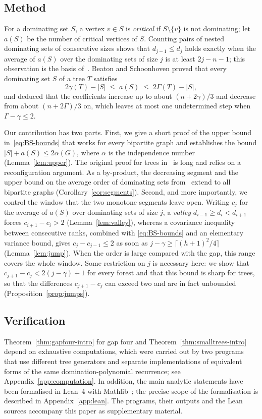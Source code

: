 \subsection*{Method}
For a dominating set $S$, a vertex $v\in S$ is \emph{critical} if
$S\setminus\{v\}$ is not dominating; let $a(S)$ be the number of critical
vertices of $S$. Counting pairs of nested dominating sets of consecutive
sizes shows that $d_{j-1}\le d_j$ holds exactly when the average of $a(S)$
over the dominating sets of size $j$ is at least $2j-n-1$; this observation
is the basis of~\cite{BS}. Beaton and Schoonhoven proved that every
dominating set $S$ of a tree $T$ satisfies
\begin{equation}\label{eq:BS-bounds}
  2\gamma(T)-|S|\;\le\; a(S)\;\le\; 2\Gamma(T)-|S| ,
\end{equation}
and deduced that the coefficients increase up to about $(n+2\gamma)/3$ and
decrease from about $(n+2\Gamma)/3$ on, which leaves at most one undetermined
step when $\Gamma-\gamma\le2$.

Our contribution has two parts. First, we give a short proof of the upper
bound in~\eqref{eq:BS-bounds} that works for every bipartite graph and
establishes the bound $|S|+a(S)\le 2\alpha(G)$, where $\alpha$ is the
independence number (Lemma~\ref{lem:upper}). The original proof for trees
in~\cite{BS} is long and relies on a reconfiguration argument. As a
by-product, the decreasing segment and the upper bound on the average order
of dominating sets from~\cite{BS} extend to all bipartite graphs
(Corollary~\ref{cor:segments}). Second, and more importantly, we control the
window that the two monotone segments leave open. Writing $c_j$ for the
average of $a(S)$ over dominating sets of size $j$, a \emph{valley}
$d_{i-1}\ge d_i<d_{i+1}$ forces $c_{i+1}-c_i>2$ (Lemma~\ref{lem:valley}),
whereas a covariance inequality between consecutive ranks, combined with
\eqref{eq:BS-bounds} and an elementary variance bound, gives
$c_{j}-c_{j-1}\le 2$ as soon as $j-\gamma\ge\lceil (h+1)^2/4\rceil$
(Lemma~\ref{lem:jump}). When the order is large compared with the gap, this
range covers the whole window. Some restriction on $j$ is necessary here: we
show that $c_{j+1}-c_j<2(j-\gamma)+1$ for every forest and that this bound is
sharp for trees, so that the differences $c_{j+1}-c_j$ can exceed two and are
in fact unbounded (Proposition~\ref{prop:jumps}).

\subsection*{Verification}
Theorem~\ref{thm:gapfour-intro} for gap four and
Theorem~\ref{thm:smalltrees-intro} depend on exhaustive computations, which
were carried out by two programs that use different tree generators and separate implementations of equivalent
forms of the same domination-polynomial recurrence; see
Appendix~\ref{app:computation}. In addition, the main analytic statements
have been formalised in Lean~4 with Mathlib~\cite{Lean,Mathlib}; the precise
scope of the formalisation is described in Appendix~\ref{app:lean}. The
programs, their outputs and the Lean sources accompany this paper as
supplementary material.

